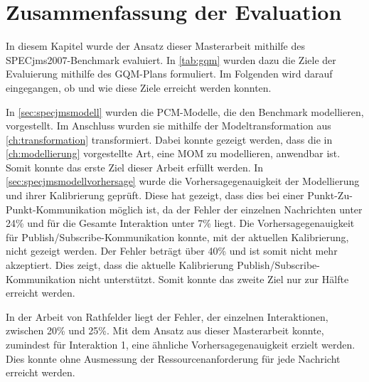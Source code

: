 \section{Zusammenfassung der Evaluation}
\label{sec:evaluationzusammenfassung}
In diesem Kapitel wurde der Ansatz dieser Masterarbeit mithilfe des SPECjms2007-Benchmark evaluiert. In \autoref{tab:gqm} wurden dazu die Ziele der Evaluierung mithilfe des GQM-Plans formuliert. Im Folgenden wird darauf eingegangen, ob und wie diese Ziele erreicht werden konnten. \par
In \autoref{sec:specjmsmodell} wurden die PCM-Modelle, die den Benchmark modellieren, vorgestellt. Im Anschluss wurden sie mithilfe der Modeltransformation aus \autoref{ch:transformation} transformiert. Dabei konnte gezeigt werden, dass die in \autoref{ch:modellierung} vorgestellte Art, eine MOM zu modellieren, anwendbar ist. Somit konnte das erste Ziel dieser Arbeit erfüllt werden. 
In \autoref{sec:specjmsmodellvorhersage} wurde die Vorhersagegenauigkeit der Modellierung und ihrer Kalibrierung geprüft. Diese hat gezeigt, dass dies bei einer Punkt-Zu-Punkt-Kommunikation möglich ist, da der Fehler der einzelnen Nachrichten unter 24\% und für die Gesamte Interaktion unter 7\% liegt. Die Vorhersagegenauigkeit für Publish/Subscribe-Kommunikation konnte, mit der aktuellen Kalibrierung, nicht gezeigt werden. Der Fehler beträgt über 40\% und ist somit nicht mehr akzeptiert. Dies zeigt, dass die aktuelle Kalibrierung Publish/Subscribe-Kommunikation nicht unterstützt. Somit konnte das zweite Ziel nur zur Hälfte erreicht werden. \par
In der Arbeit von Rathfelder \cite{Rathfelder2013} liegt der Fehler, der einzelnen Interaktionen, zwischen 20\% und 25\%. Mit dem Ansatz aus dieser Masterarbeit konnte, zumindest für Interaktion 1, eine ähnliche Vorhersagegenauigkeit erzielt werden. Dies konnte ohne Ausmessung der Ressourcenanforderung für jede Nachricht erreicht werden.



